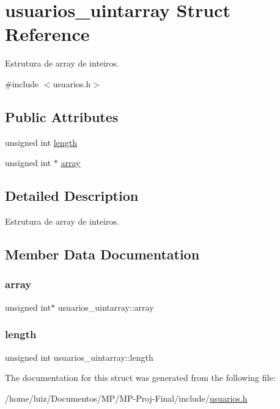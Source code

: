 \hypertarget{structusuarios__uintarray}{}\section{usuarios\+\_\+uintarray Struct Reference}
\label{structusuarios__uintarray}


Estrutura de array de inteiros.  




{\ttfamily \#include $<$usuarios.\+h$>$}

\subsection*{Public Attributes}
\begin{DoxyCompactItemize}
\item 
unsigned int \hyperlink{structusuarios__uintarray_a37d51626f928e5175475f731f3f10007}{length}
\item 
unsigned int $\ast$ \hyperlink{structusuarios__uintarray_ad1dbb13b83f10a0d454dd9dcea5e9ad4}{array}
\end{DoxyCompactItemize}


\subsection{Detailed Description}
Estrutura de array de inteiros. 

\subsection{Member Data Documentation}
\mbox{\label{structusuarios__uintarray_ad1dbb13b83f10a0d454dd9dcea5e9ad4}} 
\subsubsection{\texorpdfstring{array}{array}}
{\footnotesize\ttfamily unsigned int$\ast$ usuarios\+\_\+uintarray\+::array}

\mbox{\label{structusuarios__uintarray_a37d51626f928e5175475f731f3f10007}} 
\subsubsection{\texorpdfstring{length}{length}}
{\footnotesize\ttfamily unsigned int usuarios\+\_\+uintarray\+::length}



The documentation for this struct was generated from the following file\+:\begin{DoxyCompactItemize}
\item 
/home/luiz/\+Documentos/\+M\+P/\+M\+P-\/\+Proj-\/\+Final/include/\hyperlink{usuarios_8h}{usuarios.\+h}\end{DoxyCompactItemize}
